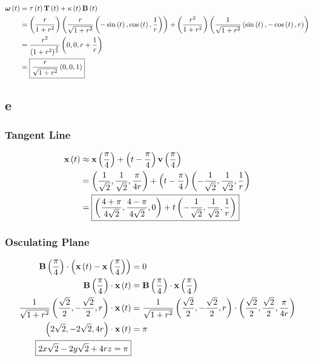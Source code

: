 \documentclass{article}
\begin{document}
\begin{align*}
  \boldsymbol{\omega} \left ( t \right) &= \tau \left ( t \right) \textbf{T} \left ( t \right) + \kappa \left ( t \right) \textbf{B} \left ( t \right) \\
                               &= \left ( \frac{r}{1+r^2} \right) \left ( \frac{r}{\sqrt{1 + r^2}} \left ( - \sin \left ( t \right), \cos \left ( t \right), \frac{1}{r} \right) \right) + \left ( \frac{r^2}{1+r^2} \right) \left ( \frac{1}{\sqrt{1+r^2}} \left ( \sin \left ( t \right), - \cos \left ( t \right), r \right) \right) \\
                               &= \frac{r^2}{\left ( 1+r^2 \right)^{\frac{3}{2}}} \left ( 0, 0, r + \frac{1}{r} \right) \\
  &= \boxed{\frac{r}{\sqrt{1+r^2}} \left ( 0, 0, 1 \right)} \\
\end{align*}


\subsection*{e}

\subsubsection*{Tangent Line}

\begin{align*}
  \textbf{x} \left ( t \right) & \approx \textbf{x} \left ( \frac{\pi}{4} \right) + \left ( t - \frac{\pi}{4} \right) \textbf{v} \left ( \frac{\pi}{4} \right)\\
                  &= \left ( \frac{1}{\sqrt{2}}, \frac{1}{\sqrt{2}}, \frac{\pi}{4r} \right) + \left ( t - \frac{\pi}{4} \right) \left ( - \frac{1}{\sqrt{2}}, \frac{1}{\sqrt{2}}, \frac{1}{r} \right) \\
                  &= \boxed{\left ( \frac{4+\pi}{4 \sqrt{2}}, \frac{4 - \pi}{4 \sqrt{2}} , 0 \right) + t \left ( - \frac{1}{\sqrt{2}}, \frac{1}{\sqrt{2}}, \frac{1}{r} \right)} \\
\end{align*}

\subsubsection*{Osculating Plane}
\begin{align*}
  \textbf{B} \left ( \frac{\pi}{4} \right) \cdot \left ( \textbf{x} \left ( t \right) - \textbf{x} \left ( \frac{\pi}{4} \right) \right) &= 0 \\
  \textbf{B} \left ( \frac{\pi}{4} \right) \cdot \textbf{x} \left ( t \right) &= \textbf{B} \left ( \frac{\pi}{4} \right) \cdot \textbf{x} \left ( \frac{\pi}{4} \right) \\
  \frac{1}{\sqrt{1+r^2}} \left ( \frac{\sqrt{2}}{2}, - \frac{\sqrt{2}}{2}, r \right) \cdot \textbf{x} \left ( t \right) &= \frac{1}{\sqrt{1+r^2}} \left ( \frac{\sqrt{2}}{2}, - \frac{\sqrt{2}}{2}, r \right) \cdot \left ( \frac{\sqrt{2}}{2}, \frac{\sqrt{2}}{2}, \frac{\pi}{4r} \right) \\
  \left ( 2\sqrt{2}, - 2\sqrt{2}, 4r \right) \cdot \textbf{x} \left ( t \right) &= \pi \\
  \boxed{2 x\sqrt{2} - 2y\sqrt{2} + 4rz = \pi} \\
\end{align*}
\end{document}
